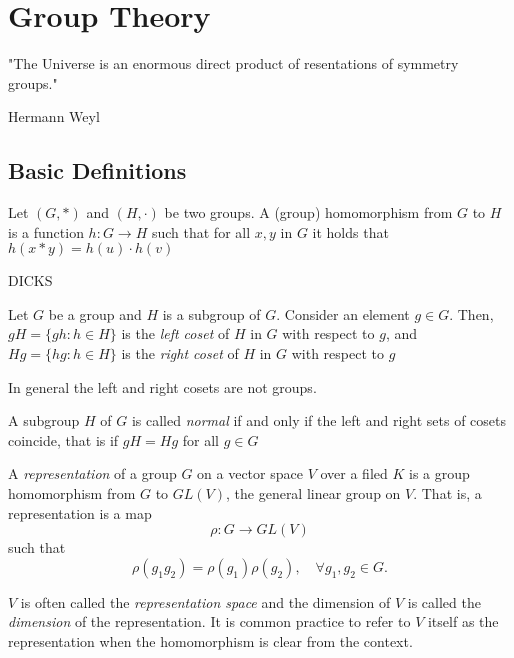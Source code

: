 \chapter{Group Theory}
\epigraph{"The Universe is an enormous direct product of resentations of
symmetry groups."}{Hermann Weyl}
\section{Basic Definitions}
\begin{definition}
Let $(G, *)$ and $(H,\cdot)$ be two groups. A (group) homomorphism from $G$ to $H$ is a function $h:G\rightarrow H$ such that for all $x,y$ in $G$ it holds that
$h(x*y) = h(u)\cdot h(v)$
\end{definition}
DICKS
\begin{definition}[Coset]
Let $G$ be a group and $H$ is a subgroup of $G$. Consider an element $g \in G$. Then, $gH = \{ gh : h\in H\}$ is the \textit{left coset} of $H$ in $G$ with respect to $g$, and $Hg = \{hg : h\in H\}$ is the \textit{right coset} of $H$ in $G$ with respect to $g$
\end{definition}

\begin{remark}
In general the left and right cosets are not groups.
\end{remark}

\begin{definition}
A subgroup $H$ of $G$ is called \textit{normal} if and only if the left and right sets of cosets coincide, that is if $gH = Hg$ for all $g\in G$ 
\end{definition}

\begin{definition}[Representation]
  A \textit{representation} of a group $G$ on a vector space $V$ over a filed
  $K$ is a group homomorphism from $G$ to $GL(V)$, the general linear group on
  $V$. That is, a representation is a map
  \begin{equation}
    \rho:G\rightarrow GL(V)
  \end{equation}
such that
\begin{equation}
  \rho(g_1g_2) = \rho(g_1)\rho(g_2), \quad \forall g_1,g_2 \in G.
\end{equation}
\end{definition}

$V$ is often called the \textit{representation space} and the dimension of $V$
is called the \textit{dimension} of the representation. It is common practice
to refer to $V$ itself as the representation when the homomorphism is clear
from the context.

